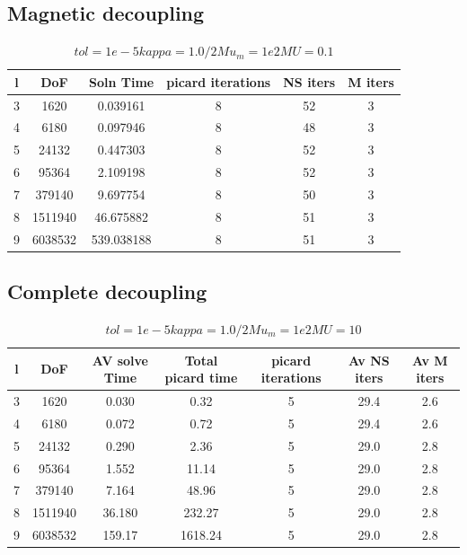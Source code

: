 \subsection{Magnetic decoupling}
\begin{table}[h!] \small
\begin{center}
\begin{tabular}{cccccc}
\hline
 l &     DoF &  Soln Time &  picard iterations &  NS iters &  M iters \\
\hline
 3 &    1620 &   0.039161 &                  8 &        52 &        3 \\
 4 &    6180 &   0.097946 &                  8 &        48 &        3 \\
 5 &   24132 &   0.447303 &                  8 &        52 &        3 \\
 6 &   95364 &   2.109198 &                  8 &        52 &        3 \\
 7 &  379140 &   9.697754 &                  8 &        50 &        3 \\
 8 &  1511940 &  46.675882                  &8&        51&        3 \\
 9&  6038532&  539.038188&                  8&        51&        3 \\
\hline
\end{tabular}
\caption{$tol = 1e-5    kappa = 1.0/2 Mu_m =1e2 MU = 0.1$}
\end{center}
\end{table}

\subsection{Complete decoupling}

\begin{table}[h!] \small
\begin{center}
\begin{tabular}{ccccccc}
\hline
 l &      DoF &  AV solve Time &  Total picard time &  picard iterations & Av NS iters & Av M iters \\
\hline
 3 &     1620 &          0.030 &               0.32 &                  5 &        29.4 &        2.6 \\
 4 &     6180 &          0.072 &               0.72 &                  5 &        29.4 &        2.6 \\
 5 &    24132 &          0.290 &               2.36 &                  5 &        29.0 &        2.8 \\
 6 &    95364 &          1.552 &              11.14 &                  5 &        29.0 &        2.8 \\
 7 &   379140 &          7.164 &              48.96 &                  5 &        29.0 &        2.8 \\
 8 &  1511940 &         36.180 &             232.27 &                  5 &        29.0 &        2.8 \\
 9 &  6038532 &        159.17 &            1618.24 &                  5 &        29.0 &        2.8 \\
\hline
\end{tabular}
\caption{$tol = 1e-5    kappa = 1.0/2 Mu_m =1e2 MU = 10$}
\end{center}
\end{table}